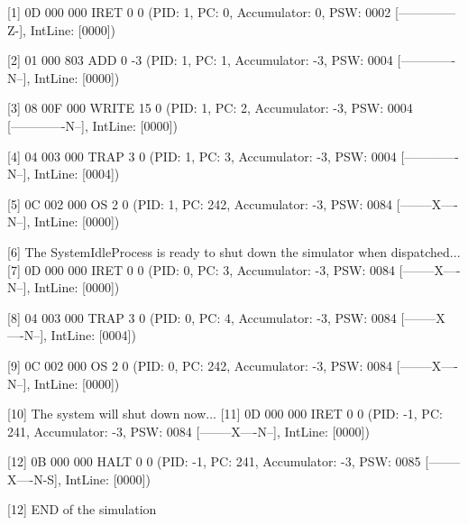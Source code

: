 [\textcolor{termred}{1}] 
{0D 000 000}
 IRET 0 0 (PID: \textcolor{termgreen}{1}, PC: \textcolor{termred}{0}, Accumulator: \textcolor{termred}{0}, PSW: \textcolor{termred}{0002} [\textcolor{termred}{--------------Z-}], IntLine: [\textcolor{termred}{0000}])

[2] 
{01 000 803}
 ADD 0 -3 (PID: \textcolor{termgreen}{1}, PC: \textcolor{termred}{1}, Accumulator: \textcolor{termred}{-3}, PSW: \textcolor{termred}{0004} [\textcolor{termred}{-------------N--}], IntLine: [\textcolor{termred}{0000}])

[3] 
{08 00F 000}
 WRITE 15 0 (PID: \textcolor{termgreen}{1}, PC: \textcolor{termred}{2}, Accumulator: \textcolor{termred}{-3}, PSW: \textcolor{termred}{0004} [\textcolor{termred}{-------------N--}], IntLine: [\textcolor{termred}{0000}])

[4] 
{04 003 000}
 TRAP 3 0 (PID: \textcolor{termgreen}{1}, PC: \textcolor{termred}{3}, Accumulator: \textcolor{termred}{-3}, PSW: \textcolor{termred}{0004} [\textcolor{termred}{-------------N--}], IntLine: [\textcolor{termred}{0004}])

[\textcolor{termred}{5}] 
{0C 002 000}
 OS 2 0 (PID: \textcolor{termgreen}{1}, PC: \textcolor{termred}{242}, Accumulator: \textcolor{termred}{-3}, PSW: \textcolor{termred}{0084} [\textcolor{termred}{--------X----N--}], IntLine: [\textcolor{termred}{0000}])

[\textcolor{termred}{6}] 
\textcolor{termred}{The SystemIdleProcess is ready to shut down the simulator when dispatched...
}
[\textcolor{termred}{7}] 
{0D 000 000}
 IRET 0 0 (PID: \textcolor{termgreen}{0}, PC: \textcolor{termred}{3}, Accumulator: \textcolor{termred}{-3}, PSW: \textcolor{termred}{0084} [\textcolor{termred}{--------X----N--}], IntLine: [\textcolor{termred}{0000}])

[\textcolor{termred}{8}] 
{04 003 000}
 TRAP 3 0 (PID: \textcolor{termgreen}{0}, PC: \textcolor{termred}{4}, Accumulator: \textcolor{termred}{-3}, PSW: \textcolor{termred}{0084} [\textcolor{termred}{--------X----N--}], IntLine: [\textcolor{termred}{0004}])

[\textcolor{termred}{9}] 
{0C 002 000}
 OS 2 0 (PID: \textcolor{termgreen}{0}, PC: \textcolor{termred}{242}, Accumulator: \textcolor{termred}{-3}, PSW: \textcolor{termred}{0084} [\textcolor{termred}{--------X----N--}], IntLine: [\textcolor{termred}{0000}])

[\textcolor{termred}{10}] 
\textcolor{termred}{The system will shut down now...
}
[\textcolor{termred}{11}] 
{0D 000 000}
 IRET 0 0 (PID: \textcolor{termgreen}{-1}, PC: \textcolor{termred}{241}, Accumulator: \textcolor{termred}{-3}, PSW: \textcolor{termred}{0084} [\textcolor{termred}{--------X----N--}], IntLine: [\textcolor{termred}{0000}])

[\textcolor{termred}{12}] 
{0B 000 000}
 HALT 0 0 (PID: \textcolor{termgreen}{-1}, PC: \textcolor{termred}{241}, Accumulator: \textcolor{termred}{-3}, PSW: \textcolor{termred}{0085} [\textcolor{termred}{--------X----N-S}], IntLine: [\textcolor{termred}{0000}])

[\textcolor{termred}{12}] 
\textcolor{termred}{END of the simulation
}

